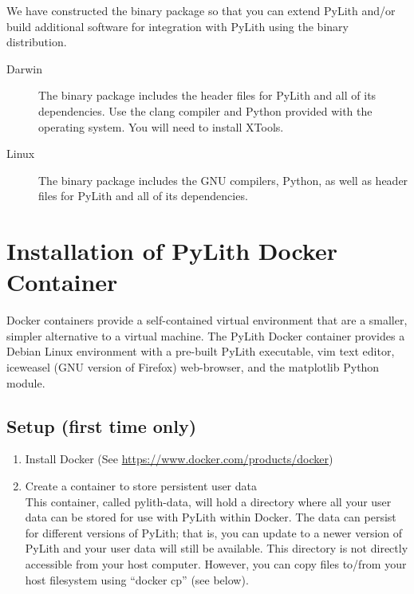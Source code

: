 We have constructed the binary package so that you can extend PyLith
and/or build additional software for integration with PyLith using the
binary distribution.

\begin{description}
\item[Darwin] The binary package includes the header files for PyLith
  and all of its dependencies. Use the clang compiler and Python
  provided with the operating system. You will need to install XTools.
\item[Linux] The binary package includes the GNU compilers, Python, as
  well as header files for PyLith and all of its dependencies.
\end{description}


\section{Installation of PyLith Docker Container}

Docker containers provide a self-contained virtual environment that
are a smaller, simpler alternative to a virtual machine. The PyLith
Docker container provides a Debian Linux environment with a pre-built
PyLith executable, vim text editor, iceweasel (GNU version of Firefox)
web-browser, and the matplotlib Python module.

\subsection{Setup (first time only)}

\begin{enumerate}
\item Install Docker (See \url{https://www.docker.com/products/docker})
\item Create a container to store persistent user data\\
  This container, called pylith-data, will hold a directory where all
  your user data can be stored for use with PyLith within Docker. The
  data can persist for different versions of PyLith; that is, you can
  update to a newer version of PyLith and your user data will still
  be available. This directory is not directly accessible from your
  host computer. However, you can copy files to/from your host filesystem
  using ``docker cp'' (see below).
\end{enumerate}

